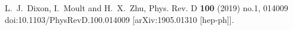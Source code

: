 L.~J.~Dixon, I.~Moult and H.~X.~Zhu,
Phys. Rev. D \textbf{100} (2019) no.1, 014009
doi:10.1103/PhysRevD.100.014009
[arXiv:1905.01310 [hep-ph]].
